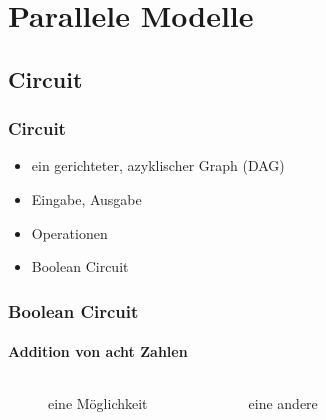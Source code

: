\section{Parallele Modelle}

\subsection{Circuit}
\begin{frame}
    \frametitle{Circuit}
    \begin{itemize}
        \item ein gerichteter, azyklischer Graph (DAG)
        \item Eingabe, Ausgabe
        \item Operationen
        \item Boolean Circuit
    \end{itemize}
\end{frame}

\begin{frame}[b]
    \frametitle{Boolean Circuit}
    \framesubtitle{Addition von acht Zahlen}
    \begin{columns}[b]
        \begin{figure}
            \centering
            
            \caption{eine Möglichkeit}
        \end{figure}
        \pause
        \begin{figure}
            \centering
            
            \caption{eine andere}
        \end{figure}
    \end{columns}
\end{frame}

